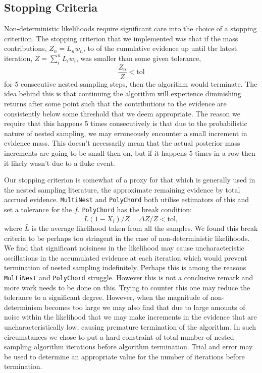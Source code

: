 \subsection{Stopping Criteria}
Non-deterministic likelihoods require significant care into the choice of a stopping criteriion. The stopping criterion that we implemented was that if the mass contributions, $ Z_n = L_nw_n$, to of the cumulative evidence up until the latest iteration, $ Z = \sum_i^n L_iw_i$, was smaller than some given tolerance,
\begin{equation}
\frac{ Z_{n}}{ Z}< \mathrm{tol}
\end{equation}
 for 5 consecutive nested sampling steps, then the algorithm would terminate. The idea behind this is that continuing the algorithm will experience diminishing returns after some point such that the contributions to the evidence are consistently below some threshold that we deem appropriate. The reason we require that this happens 5 times consecutively is that due to the probabilistic nature of nested sampling, we may erroneously encounter a small increment in evidence mass. This doesn't necessarily mean that the actual posterior mass increments are going to be small then-on, but if it happens 5 times in a row then it likely wasn't due to a fluke event.

 Our stopping criterion is somewhat of a proxy for that which is generally used in the nested sampling literature, the approximate remaining evidence by total accrued evidence. \texttt{MultiNest} and \texttt{PolyChord} both utilise estimators of this and set a tolerance for the $f$. \texttt{PolyChord} has the break condition:
%
 \begin{equation}
\bar{L}(1-X_i)/Z=\Delta Z/Z<\mathrm{tol},
 \end{equation}
%
 where $\bar{L}$ is the average likelihood taken from all the samples. We found this break criteria to be perhaps too stringent in the case of non-deterministic likelihoods. We find that significant noisiness in the likelihood may cause uncharacteristic oscillations in the accumulated evidence at each iteration which would prevent termination of nested sampling indefinitely. Perhaps this is among the reasons \texttt{MultiNest} and \texttt{PolyChord} struggle. However this is not a conclusive remark and more work needs to be done on this. Trying to counter this one may reduce the tolerance to a significant degree. However, when the magnitude of non-determinism becomes too large we may also find that due to large amounts of noise within the likelihood that we may make increments in the evidence that are uncharacteristically low, causing premature termination of the algorithm. In such circumstances we chose to put a hard constraint of total number of nested sampling algorithm iterations before algorithm termination. Trial and error may be used to determine an appropriate value for the number of iterations before termination.

